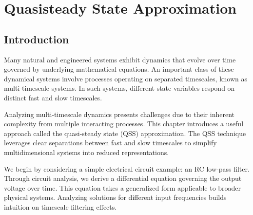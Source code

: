 \chapter{Quasisteady State Approximation}
\label{ch21} 



\vspace{1cm}

	
\section{Introduction}

Many natural and engineered systems exhibit dynamics that evolve over time governed by underlying mathematical equations. An important class of these dynamical systems involve processes operating on separated timescales, known as multi-timescale systems. In such systems, different state variables respond on distinct fast and slow timescales.

Analyzing multi-timescale dynamics presents challenges due to their inherent complexity from multiple interacting processes. This chapter introduces a useful approach called the quasi-steady state (QSS) approximation. The QSS technique leverages clear separations between fast and slow timescales to simplify multidimensional systems into reduced representations.

We begin by considering a simple electrical circuit example: an RC low-pass filter. Through circuit analysis, we derive a differential equation governing the output voltage over time. This equation takes a generalized form applicable to broader physical systems. Analyzing solutions for different input frequencies builds intuition on timescale filtering effects.

